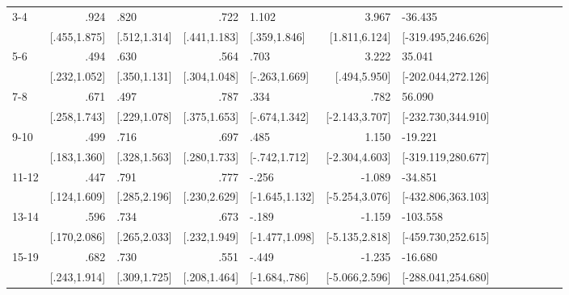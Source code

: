 \begin{table}[h]
\begin{adjustbox}{max width=\linewidth}
\begin{threeparttable}
{\begin{tabular}{l*{6}{D{.}{.}{-1}l}}
3-4             &            .924&            .820&            .722&           1.102&           3.967&         -36.435\\
                &    [.455,1.875]&    [.512,1.314]&    [.441,1.183]&    [.359,1.846]&   [1.811,6.124]&[-319.495,246.626]\\

5-6             &            .494&            .630&            .564&            .703&           3.222&          35.041\\
                &    [.232,1.052]&    [.350,1.131]&    [.304,1.048]&   [-.263,1.669]&    [.494,5.950]&[-202.044,272.126]\\

7-8             &            .671&            .497&            .787&            .334&            .782&          56.090\\
                &    [.258,1.743]&    [.229,1.078]&    [.375,1.653]&   [-.674,1.342]&  [-2.143,3.707]&[-232.730,344.910]\\

9-10            &            .499&            .716&            .697&            .485&           1.150&         -19.221\\
                &    [.183,1.360]&    [.328,1.563]&    [.280,1.733]&   [-.742,1.712]&  [-2.304,4.603]&[-319.119,280.677]\\

11-12           &            .447&            .791&            .777&           -.256&          -1.089&         -34.851\\
                &    [.124,1.609]&    [.285,2.196]&    [.230,2.629]&  [-1.645,1.132]&  [-5.254,3.076]&[-432.806,363.103]\\

13-14           &            .596&            .734&            .673&           -.189&          -1.159&        -103.558\\
                &    [.170,2.086]&    [.265,2.033]&    [.232,1.949]&  [-1.477,1.098]&  [-5.135,2.818]&[-459.730,252.615]\\

15-19           &            .682&            .730&            .551&           -.449&          -1.235&         -16.680\\
                &    [.243,1.914]&    [.309,1.725]&    [.208,1.464]&   [-1.684,.786]&  [-5.066,2.596]&[-288.041,254.680]\\


\end{tabular}}
\end{threeparttable}
\end{adjustbox}
\end{table}
